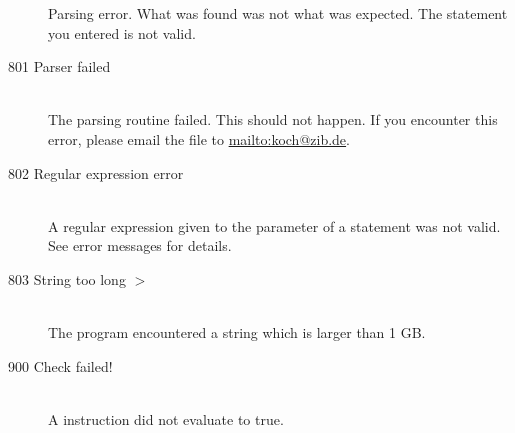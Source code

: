 \begin{description}
  Parsing error. What was found was not what was expected.
  The statement you entered is not valid.
\item[801 Parser failed]\ \\
  The parsing routine failed. This should not happen. If you encounter
  this error, please email the  file to \url{mailto:koch@zib.de}.
\item[802 Regular expression error]\ \\
  A regular expression given to the  parameter of a
   statement was not valid. See error messages for details.
\item[803 String too long \code{xxx} $>$ \code{yyy}]\ \\
  The program encountered a string which is larger than 1 GB. 
%
%
\item[900 Check failed!]\ \\
  A  instruction did not evaluate to true. 
\end{description}

